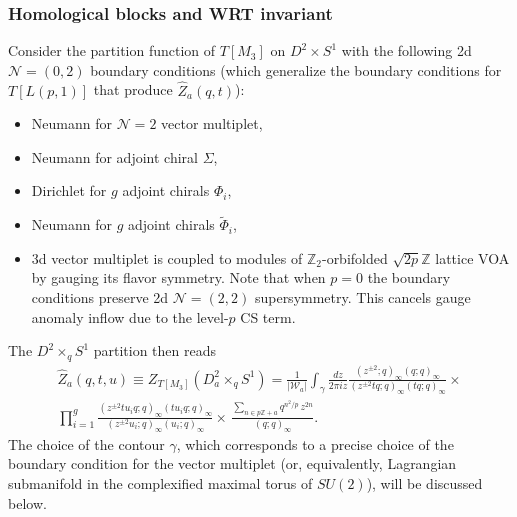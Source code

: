 \documentclass[hyper,letterpaper]{JHEP3}
\newcommand{\Z}{{\mathbb Z}}
\def\tilde{\widetilde}
\renewcommand{\hat}{\widehat}
\def\CN{{\mathcal N}}
\def\CW{{\mathcal W}}
\begin{document}
\subsubsection{Homological blocks and WRT invariant}
Consider the partition function of $T[M_3]$ on $D^2\times S^1$ with the following 2d $\CN=(0,2)$ boundary conditions (which generalize the boundary conditions for $T[L(p,1)]$ that produce $\hat{Z}_a(q,t)$):
\begin{itemize}
	\item Neumann for $\CN=2$ vector multiplet,
	\item Neumann for adjoint chiral $\Sigma$,
	\item Dirichlet for $g$ adjoint chirals $\Phi_i$,
	\item Neumann for $g$ adjoint chirals $\tilde\Phi_i$,
	\item 3d vector multiplet is coupled to modules of $\Z_2$-orbifolded $\sqrt{2p}\Z$ lattice VOA by gauging its flavor symmetry. Note that when $p=0$ the boundary conditions preserve 2d $\CN=(2,2)$ supersymmetry. This cancels gauge anomaly inflow due to the level-$p$ CS term.
\end{itemize}
The $D^2\times_q S^1$ partition then reads \cite{Yoshida:2014ssa}
\begin{multline}
	\hat{Z}_a(q,t,u)\equiv Z_{T[M_3]}(D^2_a\times_q S^1)= \frac{1}{|\CW_a|}\int_\gamma \frac{dz}{2\pi i z}
	\frac{(z^{\pm2};q)_\infty(q;q)_\infty}{(z^{\pm2}tq;q)_\infty(tq;q)_\infty}
	\times\\
\prod_{i=1}^g	\frac{(z^{\pm2}tu_iq;q)_\infty(tu_iq;q)_\infty}{(z^{\pm2}u_i;q)_\infty(u_i;q)_\infty}
\times\,\frac{\sum_{n\in p\Z+a}q^{n^2/p}\,z^{2n}}{(q;q)_\infty}.	
	\label{TCircFibBlock}
\end{multline}
The choice of the contour $\gamma$, which corresponds to a precise choice of the boundary condition for the vector multiplet
(or, equivalently, Lagrangian submanifold in the complexified maximal torus of $SU(2)$), will be discussed below.
\end{document}
